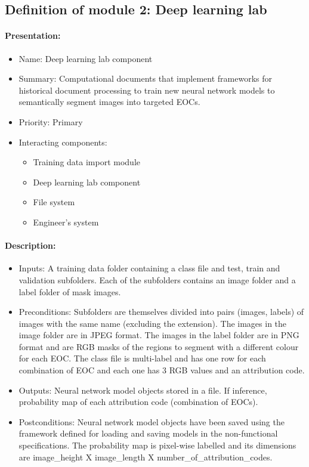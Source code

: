 \documentclass{polytech/polytech}
\numberwithin{figure}{chapter}
\begin{document}
\begin{appendix}
\subsection{Definition of module 2: Deep learning lab}

\paragraph{Presentation:}
 
\begin{itemize}
    \item Name: Deep learning lab component
    \item Summary: Computational documents that implement frameworks for historical document processing to train new neural network models to semantically segment images into targeted EOCs.
    \item Priority: Primary
    \item Interacting components:
    \begin{itemize}
        \item Training data import module
        \item Deep learning lab component
        \item File system
        \item Engineer’s system
    \end{itemize}
\end{itemize}

\paragraph{Description:}
 
\begin{itemize}
    \item Inputs: A training data folder containing a class file and test, train and validation subfolders. Each of the subfolders contains an image folder and a label folder of mask images.
    \item Preconditions: Subfolders are themselves divided into pairs (images, labels) of images with the same name (excluding the extension).
The images in the image folder are in JPEG format.
The images in the label folder are in PNG format and are RGB masks of the regions to segment with a different colour for each EOC.
The class file is multi-label and has one row for each combination of EOC and each one has 3 RGB values and an attribution code.

    \item Outputs: Neural network model objects stored in a file. If inference, probability map of each attribution code (combination of EOCs).
    \item Postconditions: Neural network model objects have been saved using the framework defined for loading and saving models in the non-functional specifications.
The probability map is pixel-wise labelled and its dimensions are image_height X image_length X number_of_attribution_codes.


\end{itemize}
\end{appendix}
\end{document}
